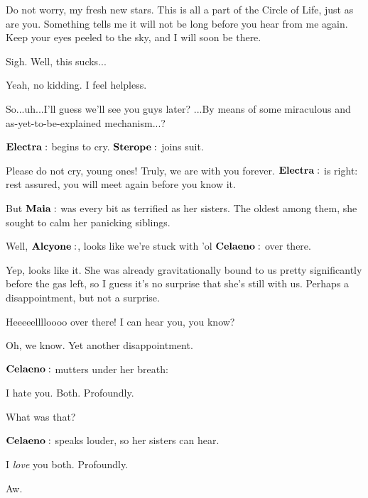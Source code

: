 \Maia Do not worry, my fresh new stars. This is all a part of the Circle of Life, just as are you.  Something tells me it will not be long before you hear from me again. Keep your eyes peeled to the sky, and I will soon be there.  

\Electra Sigh.  Well, this sucks...

\Sterope  Yeah, no kidding.   I feel helpless.

\Electra So...uh...I'll guess we'll see you guys later?  ...By means of some miraculous and as-yet-to-be-explained mechanism...?

$\Electra$ begins to cry.  $\Sterope$ joins suit.

\Maia Please do not cry, young ones!  Truly, we are with you forever.  $\Electra$ is right: rest assured, you will meet again before you know it.

But $\Maia$ was every bit as terrified as her sisters.  The oldest among them, she sought to calm her panicking siblings.

\Taygete Well, $\Alcyone$, looks like we're stuck with 'ol $\Celaeno$ over there.

\Alcyone Yep, looks like it.  She was already gravitationally bound to us pretty significantly before the gas left, so I guess it's no surprise that she's still with us.  Perhaps a disappointment, but not a surprise.

\Celaeno Heeeeelllloooo over there!  I can hear you, you know? 

\Taygete Oh, we know.  Yet another disappointment.

$\Celaeno$ mutters under her breath:

\Celaeno I hate you.  Both.  Profoundly.

\Taygete What was that?

$\Celaeno$ speaks louder, so her sisters can hear.

\Celaeno I \textit{love} you both.  Profoundly.

\Alcyone Aw.

